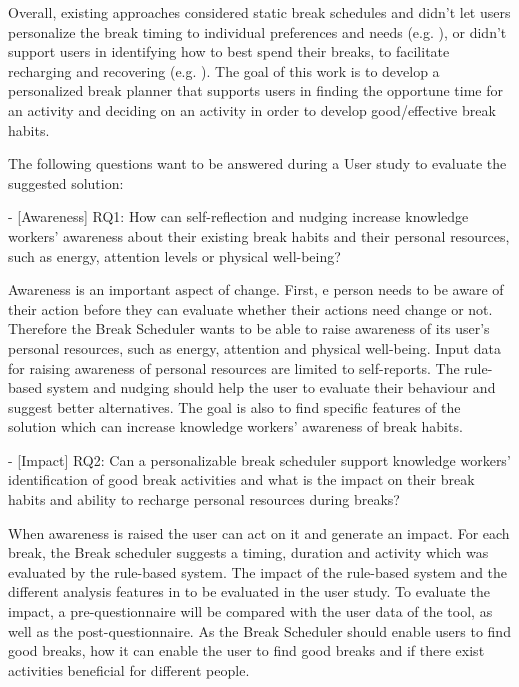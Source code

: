 \documentclass{hasel_thesis}
\begin{document}
Overall, existing approaches considered static break schedules and didn’t let users personalize the break timing to individual preferences and needs (e.g. \cite{Henning.1997} \cite{Cooley.2013}), or didn’t support users in identifying how to best spend their breaks, to facilitate recharging and recovering (e.g. \cite{Kaur.2020}). 
The goal of this work is to develop a personalized break planner that supports users in finding the opportune time for an activity and deciding on an activity in order to develop good/effective break habits. 



The following questions want to be answered during a User study to evaluate the suggested solution:

-	[Awareness] RQ1: How can self-reflection and nudging increase knowledge workers' awareness about their existing break habits and their personal resources, such as energy, attention levels or physical well-being?

Awareness is an important aspect of change. First, e person needs to be aware of their action before they can evaluate whether their actions need change or not. Therefore the Break Scheduler wants to be able to raise awareness of its user's personal resources, such as energy, attention and physical well-being. Input data for raising awareness of personal resources are limited to self-reports. The rule-based system and nudging should help the user to evaluate their behaviour and suggest better alternatives. The goal is also to find specific features of the solution which can increase knowledge workers' awareness of break habits.


-	[Impact] RQ2: Can a personalizable break scheduler support knowledge workers' identification of good break activities and what is the impact on their break habits and ability to recharge personal resources during breaks?

When awareness is raised the user can act on it and generate an impact. For each break, the Break scheduler suggests a timing, duration and activity which was evaluated by the rule-based system. The impact of the rule-based system and the different analysis features in to be evaluated in the user study. To evaluate the impact, a pre-questionnaire will be compared with the user data of the tool, as well as the post-questionnaire. As the Break Scheduler should enable users to find good breaks, how it can enable the user to find good breaks and if there exist activities beneficial for different people.
\end{document}
